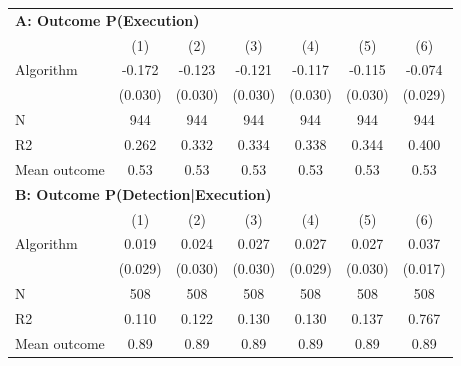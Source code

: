 \begin{tabular}{lcccccc} \toprule
\multicolumn{7}{l}{\textbf{A: Outcome P(Execution)}} \\ \multicolumn{1}{l}{} & (1) & (2) & (3) & (4) & (5) & (6) \\ \midrule
Algorithm   &      -0.172\sym{***}&      -0.123\sym{***}&      -0.121\sym{***}&      -0.117\sym{***}&      -0.115\sym{***}&      -0.074\sym{**} \\
            &     (0.030)         &     (0.030)         &     (0.030)         &     (0.030)         &     (0.030)         &     (0.029)         \\
\midrule
N           &         944         &         944         &         944         &         944         &         944         &         944         \\
R2          &       0.262         &       0.332         &       0.334         &       0.338         &       0.344         &       0.400         \\
Mean outcome&        0.53         &        0.53         &        0.53         &        0.53         &        0.53         &        0.53         \\

\midrule \multicolumn{7}{l}{\textbf{B: Outcome P(Detection|Execution)}} \\ \multicolumn{1}{l}{} & (1) & (2) & (3) & (4) & (5) & (6) \\ \midrule
Algorithm   &       0.019         &       0.024         &       0.027         &       0.027         &       0.027         &       0.037\sym{**} \\
            &     (0.029)         &     (0.030)         &     (0.030)         &     (0.029)         &     (0.030)         &     (0.017)         \\
\midrule
N           &         508         &         508         &         508         &         508         &         508         &         508         \\
R2          &       0.110         &       0.122         &       0.130         &       0.130         &       0.137         &       0.767         \\
Mean outcome&        0.89         &        0.89         &        0.89         &        0.89         &        0.89         &        0.89         \\


\end{tabular}
